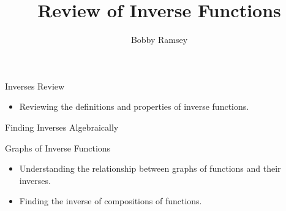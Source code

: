 \documentclass{ximera}
\author{Bobby Ramsey}
\title{Review of Inverse Functions}
\begin{document}
\begin{abstract}
\end{abstract}
\maketitle


\begin{objectives}
	\item Inverses Review
		\begin{itemize}
			\item Reviewing the definitions and properties of inverse functions.
		\end{itemize}
	
	\item Finding Inverses Algebraically
	\item Graphs of Inverse Functions
		\begin{itemize}
			\item Understanding the relationship between graphs of functions and their inverses.
			\item Finding the inverse of compositions of functions.
		\end{itemize}

\end{objectives}
\end{document}
